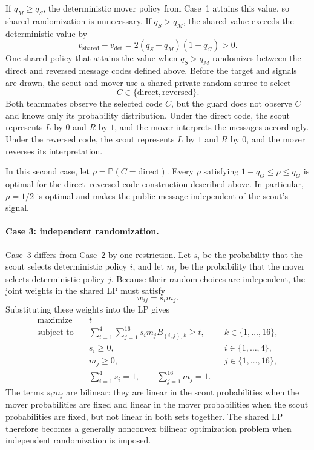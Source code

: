 If $q_M\geq q_S$, the deterministic mover policy from Case~1 attains this value, so shared randomization is unnecessary. If $q_S>q_M$, the shared value exceeds the deterministic value by
\[
    v_{\mathrm{shared}}-v_{\mathrm{det}}
    =
    2(q_S-q_M)(1-q_G)>0.
\]
One shared policy that attains the value when $q_S>q_M$ randomizes between the direct and reversed message codes defined above. Before the target and signals are drawn, the scout and mover use a shared private random source to select
\[
    C\in\{\mathrm{direct},\mathrm{reversed}\}.
\]
Both teammates observe the selected code $C$, but the guard does not observe $C$ and knows only its probability distribution. Under the direct code, the scout represents $L$ by $0$ and $R$ by $1$, and the mover interprets the messages accordingly. Under the reversed code, the scout represents $L$ by $1$ and $R$ by $0$, and the mover reverses its interpretation.

In this second case, let $\rho=\mathbb{P}(C=\mathrm{direct})$. Every $\rho$ satisfying $1-q_G\leq \rho\leq q_G$ is optimal for the direct--reversed code construction described above. In particular, $\rho=1/2$ is optimal and makes the public message independent of the scout's signal.

\paragraph{Case 3: independent randomization.}
Case~3 differs from Case~2 by one restriction. Let $s_i$ be the probability that the scout selects deterministic policy $i$, and let $m_j$ be the probability that the mover selects deterministic policy $j$. Because their random choices are independent, the joint weights in the shared LP must satisfy
\[
    w_{ij}=s_i m_j.
\]
Substituting these weights into the LP gives
\[
    \begin{aligned}
    \text{maximize}\quad & t \\
    \text{subject to}\quad
    & \sum_{i=1}^{4}\sum_{j=1}^{16}
      s_i m_j B_{(i,j),k}\geq t,
      && k\in\{1,\ldots,16\}, \\
    & s_i\geq0,
      && i\in\{1,\ldots,4\}, \\
    & m_j\geq0,
      && j\in\{1,\ldots,16\}, \\
    & \sum_{i=1}^{4}s_i=1,
      \qquad
      \sum_{j=1}^{16}m_j=1.
    \end{aligned}
\]
The terms $s_i m_j$ are bilinear: they are linear in the scout probabilities when the mover probabilities are fixed and linear in the mover probabilities when the scout probabilities are fixed, but not linear in both sets together. The shared LP therefore becomes a generally nonconvex bilinear optimization problem when independent randomization is imposed.

